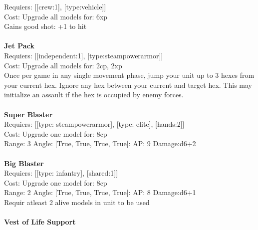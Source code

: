 Requiers: [[crew:1], [type:vehicle]] \\
Cost: Upgrade all models for: 6xp \\
Gains good shot: +1 to hit\\ 









\ \\
{\bf Jet Pack } \\

Requiers: [[independent:1], [type:steampowerarmor]] \\
Cost: Upgrade all models for: 2cp, 2xp \\
Once per game in any single movement phase, jump your unit up to 3 hexes from your current hex. Ignore any hex between your current and target hex. This may initialize an assault if the hex is occupied by enemy forces.\\ 









\ \\
{\bf Super Blaster } \\

Requiers: [[type: steampowerarmor], [type: elite], [hands:2]] \\
Cost: Upgrade one model for: 8cp \\


Range: 3  Angle: [True, True, True, True]: AP: 9 Damage:d6+2 \\








\ \\
{\bf Big Blaster } \\

Requiers: [[type: infantry], [shared:1]] \\
Cost: Upgrade one model for: 8cp \\


Range: 2  Angle: [True, True, True, True]: AP: 8 Damage:d6+1 \\
Requir atleast 2 alive models in unit to be used\\ 








\ \\
{\bf Vest of Life Support } \\

